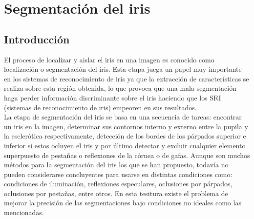 
\chapter{Segmentación del iris} %

\label{Capítulo 4} %




\section{Introducción}

El proceso de localizar y aislar el iris en una imagen es conocido como localización o segmentación del iris. Esta etapa juega un papel muy importante en los sistemas de reconocimiento de iris ya que la extracción de características se realiza sobre esta región obtenida, lo que provoca que una mala segmentación haga perder información discriminante sobre el iris haciendo que los SRI (sistemas de reconocimiento de iris) empeoren en sus resultados. \\

La etapa de segmentación del iris se basa en una secuencia de tareas: encontrar un iris en la imagen, determinar sus contornos interno y externo entre la pupila y la esclerótica respectivamente, detección de los bordes de los párpados superior e inferior si estos ocluyen el iris y por último detectar y excluir cualquier elemento superpuesto de pestañas o reflexiones de la córnea o de gafas. Aunque son muchos métodos para la segmentación del iris los que se han propuesto, todavía no pueden considerarse concluyentes para usarse en distintas condiciones como: condiciones de iluminación, reflexiones especulares, oclusiones por párpados, oclusiones por pestañas, entre otros. En esta tesitura existe el problema de mejorar la precisión de las segmentaciones bajo condiciones no ideales como las mencionadas. \\


